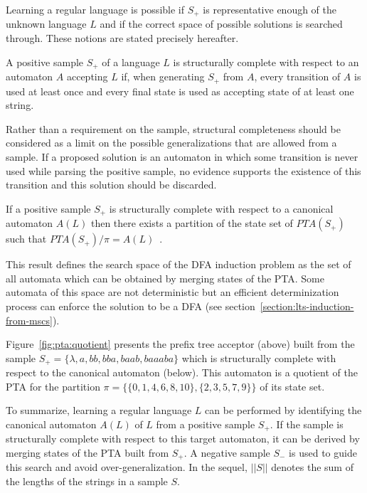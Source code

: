 Learning a regular language is possible if $S_+$ is representative enough of the unknown language $L$ and if the correct space of possible solutions is searched through. These notions are stated precisely hereafter.

\begin{definition} A positive sample $S_+$ of a language $L$ is structurally complete with respect to an automaton $A$ accepting $L$ if, when generating $S_+$ from $A$, every transition of $A$ is used at least once and every final state is used as accepting state of at least one string.
\label{structural:completeness}
\end{definition}

Rather than a requirement on the sample, structural completeness should be considered as a limit on the possible generalizations that are allowed from a sample. If a proposed solution is an automaton in which some transition is never used while parsing the positive sample, no evidence supports the existence of this transition and this solution should be discarded. 

\begin{theorem}
\label{search:theo}
If a positive sample $S_+$ is structurally complete with respect to a canonical automaton $A(L)$ then there exists a partition of the state set of $PTA(S_+)$ such that $PTA(S_+)/\pi = A(L)$~\cite{Dupont:1994}.
\end{theorem} 

This result defines the search space of the DFA induction problem as the set of all automata which can be obtained by merging states of the PTA. Some automata of this space are not deterministic but an efficient determinization process can enforce the solution to be a DFA (see section~\ref{section:lts-induction-from-mscs}).

Figure~\ref{fig:pta:quotient} presents the prefix tree acceptor (above) built from the sample 
$S_+ = \{\lambda,a,bb,bba,baab,baaaba\}$ which is structurally complete with respect to the canonical automaton (below).
This automaton is a quotient of the PTA for the partition $\pi=\{\{0,1,4,6,8,10\},\{2,3,5,7,9\}\}$ of its state set.

To summarize, learning a regular language $L$ can be performed by identifying the canonical automaton $A(L)$ of $L$ from a positive sample $S_+$. If the sample is structurally complete with respect to this target automaton, it can be derived by merging states of the PTA built from $S_+$. A negative sample $S_-$ is used to guide this search and avoid over-generalization. In the sequel, $||S||$ denotes the sum of the lengths of the strings in a sample $S$.

